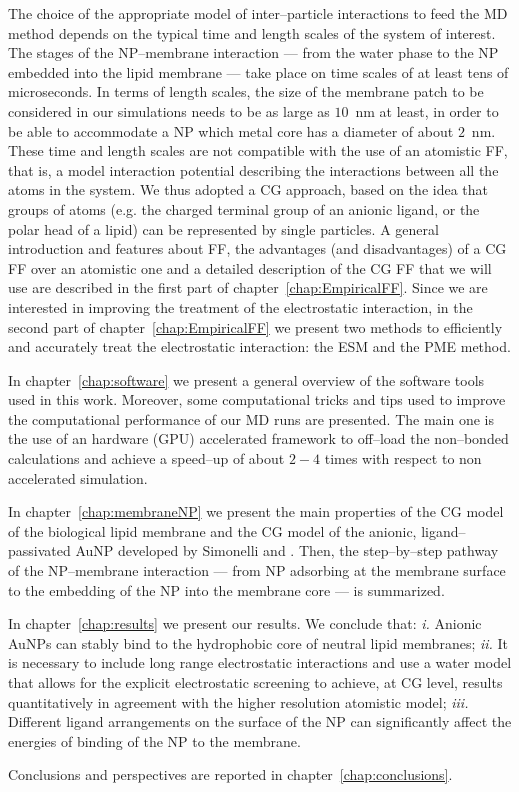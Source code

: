 The choice of the appropriate model of inter--particle interactions to feed the \ac{MD} method depends on the 
typical time and length scales of the system of interest. The stages of the \ac{NP}--membrane interaction --- from 
the water phase to the \ac{NP} embedded into the lipid membrane  --- take place on time scales of at least tens of 
microseconds. In terms of length scales, the size of the membrane patch to be considered in our simulations needs 
to be as large as $10$~nm at least, in order to be able to accommodate a \ac{NP} which metal core has a diameter 
of about $2$~nm. These time and length scales are not compatible with the use of an atomistic \ac{FF}, that is, a 
model interaction potential describing the interactions between all the atoms in the system. We thus adopted a 
\ac{CG} approach, based on the idea that groups of atoms (e.g. the charged terminal group of an anionic ligand, or 
the polar head of a lipid) can be represented by single particles. A general introduction and features about 
\ac{FF}, the advantages (and disadvantages) of a \ac{CG} \ac{FF} over an atomistic one and a detailed description 
of the \ac{CG} \ac{FF} that we will use are described in the first part of chapter~\ref{chap:EmpiricalFF}. Since 
we are interested in improving the treatment of the electrostatic interaction, in the second part of 
chapter~\ref{chap:EmpiricalFF} we present two methods to efficiently and accurately treat the electrostatic 
interaction: the \ac{ESM} and the \ac{PME} method.

In chapter~\ref{chap:software} we present a general overview of the software tools used in this work. Moreover, 
some computational tricks and tips used to improve the computational performance of our \ac{MD} runs are 
presented. The main one is the use of an hardware (GPU) accelerated framework to off--load the non--bonded 
calculations and achieve a speed--up of about $2-4$ times with respect to non accelerated simulation.

In chapter~\ref{chap:membraneNP} we present the main properties of the \ac{CG} model of the biological lipid 
membrane and the \ac{CG} model of the anionic, ligand--passivated \ac{AuNP} developed by Simonelli \etal{} 
\cite{simonelliThesis} and \cite{ourPaper}. Then, the step--by--step pathway of the \ac{NP}--membrane interaction 
--- from \ac{NP} adsorbing at the membrane surface to the embedding of the \ac{NP} into the membrane core --- is 
summarized.

In chapter~\ref{chap:results} we present our results. We conclude that: \textit{i.} Anionic \acp{AuNP} can stably 
bind to the hydrophobic core of neutral lipid membranes; \textit{ii.} It is necessary to include long range 
electrostatic interactions and use a water model that allows for the explicit electrostatic screening to achieve, 
at \ac{CG} level, results quantitatively in agreement with the higher resolution atomistic model; \textit{iii.} 
Different ligand arrangements on the surface of the \ac{NP} can significantly affect the energies of binding of 
the \ac{NP} to the membrane.

Conclusions and perspectives are reported in chapter~\ref{chap:conclusions}.

\restoretoc
\endgroup